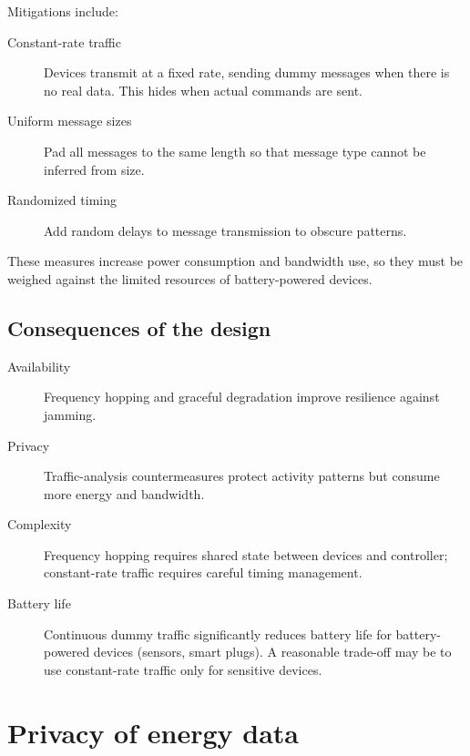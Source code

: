 Mitigations include:
\begin{description}
  \item[Constant-rate traffic] Devices transmit at a fixed rate,
    sending dummy messages when there is no real data.
    This hides when actual commands are sent.
  \item[Uniform message sizes] Pad all messages to the same length
    so that message type cannot be inferred from size.
  \item[Randomized timing] Add random delays to message
    transmission to obscure patterns.
\end{description}

These measures increase power consumption and bandwidth use, so they must
be weighed against the limited resources of battery-powered devices.

\subsection{Consequences of the design}

\begin{description}
  \item[Availability] Frequency hopping and graceful degradation improve
    resilience against jamming.
  \item[Privacy] Traffic-analysis countermeasures protect activity patterns
    but consume more energy and bandwidth.
  \item[Complexity] Frequency hopping requires shared state between devices
    and controller; constant-rate traffic requires careful timing management.
  \item[Battery life] Continuous dummy traffic significantly reduces battery
    life for battery-powered devices (sensors, smart plugs).
    A reasonable trade-off may be to use constant-rate traffic only for
    sensitive devices.
\end{description}


\section{Privacy of energy data}\label{EnergyPrivacy}


